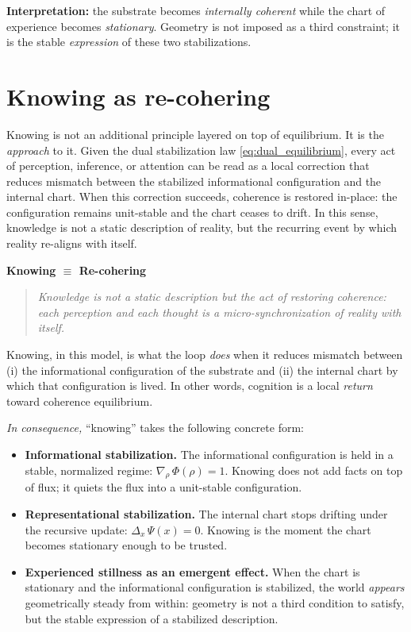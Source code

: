 \documentclass[11pt]{article}
\begin{document}
\textbf{Interpretation:} the substrate becomes \emph{internally coherent} while the chart of
experience becomes \emph{stationary}. Geometry is not imposed as a third constraint; it is
the stable \emph{expression} of these two stabilizations.
\vspace{0.6em}

\section{Knowing as re-cohering}


Knowing is not an additional principle layered on top of equilibrium. It is the \emph{approach} to it.
Given the dual stabilization law \eqref{eq:dual_equilibrium}, every act of perception, inference, or
attention can be read as a local correction that reduces mismatch between the stabilized informational
configuration and the internal chart. When this correction succeeds, coherence is restored in-place:
the configuration remains unit-stable and the chart ceases to drift. In this sense, knowledge is not a
static description of reality, but the recurring event by which reality re-aligns with itself.

\begin{center}
\textbf{Knowing $\equiv$ Re-cohering}
\end{center}

\begin{quote}\itshape
Knowledge is not a static description but the act of restoring coherence: each perception and
each thought is a micro-synchronization of reality with itself.
\end{quote}

Knowing, in this model, is what the loop \emph{does} when it reduces mismatch between
(i) the informational configuration of the substrate and (ii) the internal chart by which that configuration
is lived. In other words, cognition is a local \emph{return} toward coherence equilibrium.

\textit{In consequence,} ``knowing'' takes the following concrete form:

\begin{itemize}
\item \textbf{Informational stabilization.}
The informational configuration is held in a stable, normalized regime:
$\nabla_{\rho}\,\Phi(\rho)=1$.
Knowing does not add facts on top of flux; it quiets the flux into a unit-stable configuration.

\item \textbf{Representational stabilization.}
The internal chart stops drifting under the recursive update:
$\Delta_{x}\,\Psi(x)=0$.
Knowing is the moment the chart becomes stationary enough to be trusted.

\item \textbf{Experienced stillness as an emergent effect.}
When the chart is stationary and the informational configuration is stabilized, the world
\emph{appears} geometrically steady from within: geometry is not a third condition to satisfy,
but the stable expression of a stabilized description.
\end{itemize}
\end{document}
